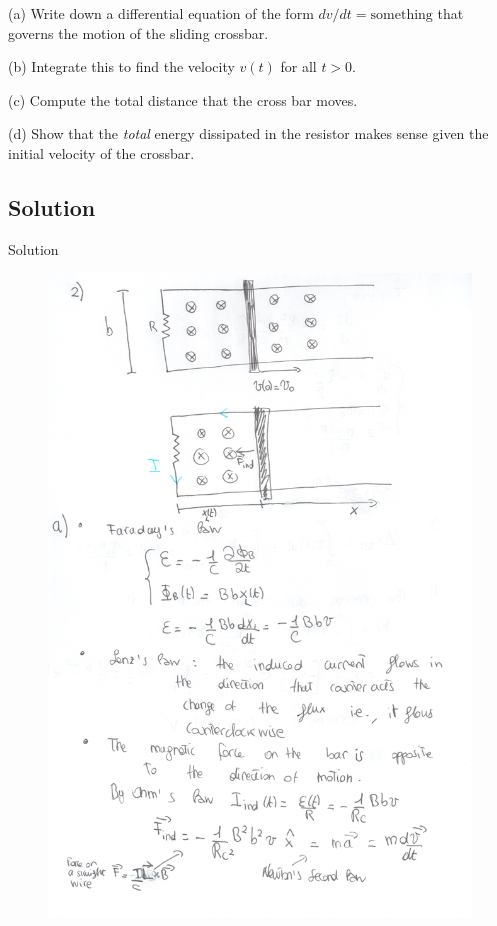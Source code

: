 \documentclass[solutions]{esg8022pset}
\begin{document}
\par\noindent (a) Write down a differential equation of the form
$dv/dt = \mbox{something}$ that governs the motion of the sliding
crossbar.

\par\noindent (b) Integrate this to find the velocity $v(t)$ for all
$t > 0$.

\par\noindent (c) Compute the total distance that the cross bar moves.

\par\noindent (d) Show that the {\it total} energy dissipated in the
resistor makes sense given the initial velocity of the crossbar.
\subsection{Solution}
Solution
  \begin{figure}[H]
    \centering
    \includegraphics{ps9_2a}
  \end{figure}
\end{document}
